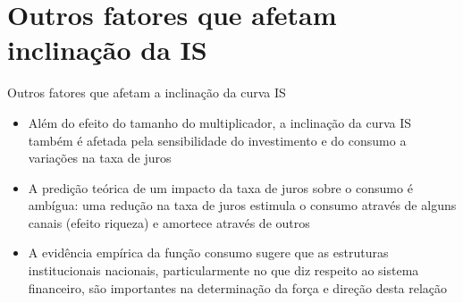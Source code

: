 \documentclass[10pt]{beamer}
\begin{document}
\section{Outros fatores que afetam inclinação da IS}
\begin{frame}
    {Outros fatores que afetam a inclinação da curva IS}
    \begin{itemize}
        \item Além do efeito do tamanho do multiplicador, a inclinação da curva IS também é afetada pela sensibilidade do investimento e do consumo a variações na taxa de juros\bigskip
        \item A predição teórica de um impacto da taxa de juros sobre o consumo é ambígua: uma redução na taxa de juros estimula o consumo através de alguns canais (efeito riqueza) e amortece através de outros\bigskip
        \item A evidência empírica da função consumo sugere que as estruturas institucionais nacionais, particularmente no que diz respeito ao sistema financeiro, são importantes na determinação da força e direção desta relação\bigskip        
    \end{itemize}
\end{frame}

\end{document}
